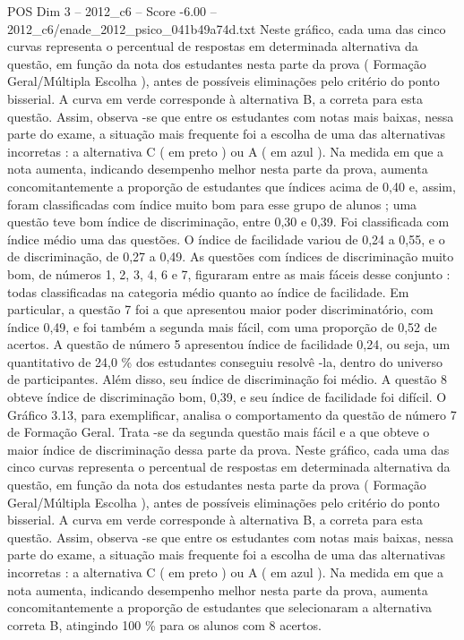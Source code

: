 \begin{textsample}{POS Dim 3 – 2012\_c6 – Score -6.00 – 2012\_c6/enade\_2012\_psico\_041b49a74d.txt}
Neste gráfico, cada uma das cinco curvas representa o percentual de respostas em determinada alternativa da questão, em função da nota dos estudantes nesta parte da prova ( Formação Geral/Múltipla Escolha ), antes de possíveis eliminações pelo critério do ponto bisserial.
A curva em verde corresponde à alternativa B, a correta para esta questão.
Assim, observa -se que entre os estudantes com notas mais baixas, nessa parte do exame, a situação mais frequente foi a escolha de uma das alternativas incorretas : a alternativa C ( em preto ) ou A ( em azul ).
Na medida em que a nota aumenta, indicando desempenho melhor nesta parte da prova, aumenta concomitantemente a proporção de estudantes que índices acima de 0,40 e, assim, foram classificadas com índice muito bom para esse grupo de alunos ; uma questão teve bom índice de discriminação, entre 0,30 e 0,39.
Foi classificada com índice médio uma das questões.
O índice de facilidade variou de 0,24 a 0,55, e o de discriminação, de 0,27 a 0,49.
As questões com índices de discriminação muito bom, de números 1, 2, 3, 4, 6 e 7, figuraram entre as mais fáceis desse conjunto : todas classificadas na categoria médio quanto ao índice de facilidade.
Em particular, a questão 7 foi a que apresentou maior poder discriminatório, com índice 0,49, e foi também a segunda mais fácil, com uma proporção de 0,52 de acertos.
A questão de número 5 apresentou índice de facilidade 0,24, ou seja, um quantitativo de 24,0 \% dos estudantes conseguiu resolvê -la, dentro do universo de participantes.
Além disso, seu índice de discriminação foi médio.
A questão 8 obteve índice de discriminação bom, 0,39, e seu índice de facilidade foi difícil.
O Gráfico 3.13, para exemplificar, analisa o comportamento da questão de número 7 de Formação Geral.
Trata -se da segunda questão mais fácil e a que obteve o maior índice de discriminação dessa parte da prova.
Neste gráfico, cada uma das cinco curvas representa o percentual de respostas em determinada alternativa da questão, em função da nota dos estudantes nesta parte da prova ( Formação Geral/Múltipla Escolha ), antes de possíveis eliminações pelo critério do ponto bisserial.
A curva em verde corresponde à alternativa B, a correta para esta questão.
Assim, observa -se que entre os estudantes com notas mais baixas, nessa parte do exame, a situação mais frequente foi a escolha de uma das alternativas incorretas : a alternativa C ( em preto ) ou A ( em azul ).
Na medida em que a nota aumenta, indicando desempenho melhor nesta parte da prova, aumenta concomitantemente a proporção de estudantes que selecionaram a alternativa correta B, atingindo 100 \% para os alunos com 8 acertos.

\end{textsample}

